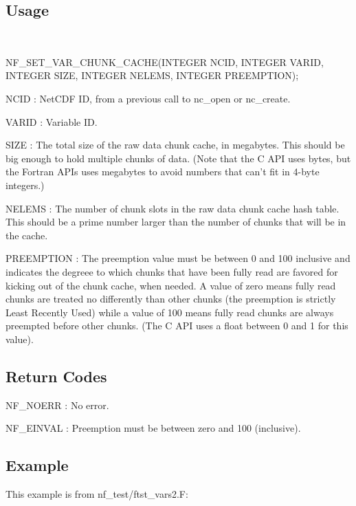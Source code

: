 \subsection*{Usage }

 

N\+F\+\_\+\+S\+E\+T\+\_\+\+V\+A\+R\+\_\+\+C\+H\+U\+N\+K\+\_\+\+C\+A\+C\+HE(I\+N\+T\+E\+G\+ER N\+C\+ID, I\+N\+T\+E\+G\+ER V\+A\+R\+ID, I\+N\+T\+E\+G\+ER S\+I\+ZE, I\+N\+T\+E\+G\+ER N\+E\+L\+E\+MS, I\+N\+T\+E\+G\+ER P\+R\+E\+E\+M\+P\+T\+I\+ON);

{\ttfamily N\+C\+ID} \+: Net\+C\+DF ID, from a previous call to nc\+\_\+open or nc\+\_\+create.

{\ttfamily V\+A\+R\+ID} \+: Variable ID.

{\ttfamily S\+I\+ZE} \+: The total size of the raw data chunk cache, in megabytes. This should be big enough to hold multiple chunks of data. (Note that the C A\+PI uses bytes, but the Fortran A\+P\+Is uses megabytes to avoid numbers that can’t fit in 4-\/byte integers.)

{\ttfamily N\+E\+L\+E\+MS} \+: The number of chunk slots in the raw data chunk cache hash table. This should be a prime number larger than the number of chunks that will be in the cache.

{\ttfamily P\+R\+E\+E\+M\+P\+T\+I\+ON} \+: The preemption value must be between 0 and 100 inclusive and indicates the degreee to which chunks that have been fully read are favored for kicking out of the chunk cache, when needed. A value of zero means fully read chunks are treated no differently than other chunks (the preemption is strictly Least Recently Used) while a value of 100 means fully read chunks are always preempted before other chunks. (The C A\+PI uses a float between 0 and 1 for this value).

\subsection*{Return Codes }

{\ttfamily N\+F\+\_\+\+N\+O\+E\+RR} \+: No error.

{\ttfamily N\+F\+\_\+\+E\+I\+N\+V\+AL} \+: Preemption must be between zero and 100 (inclusive).

\subsection*{Example }

This example is from nf\+\_\+test/ftst\+\_\+vars2.\+F\+:

